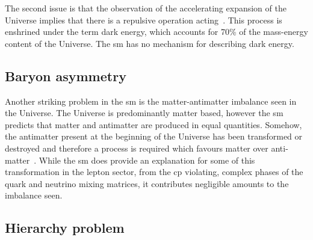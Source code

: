The second issue is that the observation of the accelerating expansion of the Universe implies that there is a repulsive operation acting~\cite{Th:DM4}.
This process is enshrined under the term dark energy, which accounts for 70\% of the mass-energy content of the Universe.
The \acrshort{sm} has no mechanism for describing dark energy.

\subsection{Baryon asymmetry} %
\label{sub:baryon_asymmetry}

Another striking problem in the \acrshort{sm} is the matter-antimatter imbalance seen in the Universe.
The Universe is predominantly matter based, however the \acrshort{sm} predicts that matter and antimatter are produced in equal quantities.
Somehow, the antimatter present at the beginning of the Universe has been transformed or destroyed and therefore a process is required which favours matter over anti-matter~\cite{Th:BaryonAsym}.
While the \acrshort{sm} does provide an explanation for some of this transformation in the lepton sector, from the \acrshort{cp} violating, complex phases of the quark and neutrino mixing matrices, it contributes negligible amounts to the imbalance seen.




\subsection{Hierarchy problem} %
\label{sub:hierarchy_problem}


